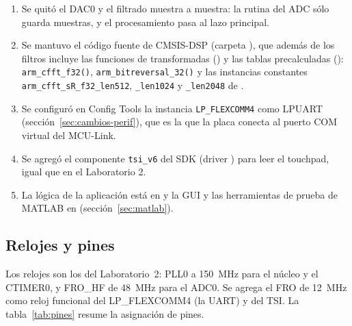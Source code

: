 \documentclass[11pt,a4paper]{article}
\begin{document}
\begin{enumerate}[nosep]
  \item Se quitó el DAC0 y el filtrado muestra a muestra: la rutina del ADC
        sólo guarda muestras, y el procesamiento pasa al lazo principal.
  \item Se mantuvo el código fuente de CMSIS-DSP (carpeta
        ), que además de los filtros incluye las
        funciones de transformadas () y las
        tablas precalculadas ():
        \texttt{arm\_cfft\_f32()}, \texttt{arm\_bitreversal\_32()} y las
        instancias constantes \texttt{arm\_cfft\_sR\_f32\_len512},
        \texttt{\_len1024} y \texttt{\_len2048} de
        .
  \item Se configuró en Config Tools la instancia \texttt{LP\_FLEXCOMM4}
        como LPUART (sección~\ref{sec:cambios-perif}), que es la que la placa
        conecta al puerto COM virtual del MCU-Link.
  \item Se agregó el componente \texttt{tsi\_v6} del SDK (driver
        ) para leer el touchpad, igual que en el
        Laboratorio 2.
  \item La lógica de la aplicación está en  y la GUI y
        las herramientas de prueba de MATLAB en 
        (sección~\ref{sec:matlab}).
\end{enumerate}

\subsection{Relojes y pines}

Los relojes son los del Laboratorio~2: PLL0 a \qty{150}{\mega\hertz} para el
núcleo y el CTIMER0, y FRO\_HF de \qty{48}{\mega\hertz} para el ADC0. Se
agrega el FRO de \qty{12}{\mega\hertz} como reloj funcional del
LP\_FLEXCOMM4 (la UART) y del TSI. La tabla~\ref{tab:pines} resume la
asignación de pines.
\end{document}
